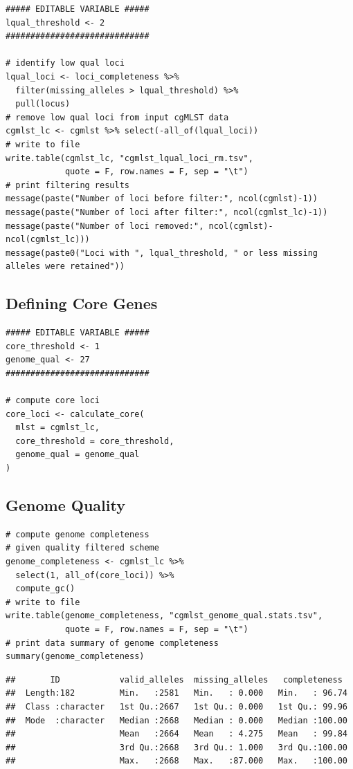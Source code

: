 \documentclass[
]{book}
\begin{document}
\begin{verbatim}
##### EDITABLE VARIABLE #####
lqual_threshold <- 2
#############################

# identify low qual loci
lqual_loci <- loci_completeness %>% 
  filter(missing_alleles > lqual_threshold) %>% 
  pull(locus)
# remove low qual loci from input cgMLST data
cgmlst_lc <- cgmlst %>% select(-all_of(lqual_loci))
# write to file
write.table(cgmlst_lc, "cgmlst_lqual_loci_rm.tsv",
            quote = F, row.names = F, sep = "\t")
# print filtering results
message(paste("Number of loci before filter:", ncol(cgmlst)-1))
message(paste("Number of loci after filter:", ncol(cgmlst_lc)-1))
message(paste("Number of loci removed:", ncol(cgmlst)-ncol(cgmlst_lc)))
message(paste0("Loci with ", lqual_threshold, " or less missing alleles were retained"))
\end{verbatim}

\subsection{Defining Core Genes}\label{defining-core-genes}

\begin{verbatim}
##### EDITABLE VARIABLE #####
core_threshold <- 1
genome_qual <- 27
#############################

# compute core loci
core_loci <- calculate_core(
  mlst = cgmlst_lc,
  core_threshold = core_threshold,
  genome_qual = genome_qual
)
\end{verbatim}

\subsection{Genome Quality}\label{genome-quality}

\begin{verbatim}
# compute genome completeness
# given quality filtered scheme
genome_completeness <- cgmlst_lc %>% 
  select(1, all_of(core_loci)) %>% 
  compute_gc()
# write to file
write.table(genome_completeness, "cgmlst_genome_qual.stats.tsv",
            quote = F, row.names = F, sep = "\t")
# print data summary of genome completeness
summary(genome_completeness)
\end{verbatim}

\begin{verbatim}
##       ID            valid_alleles  missing_alleles   completeness   
##  Length:182         Min.   :2581   Min.   : 0.000   Min.   : 96.74  
##  Class :character   1st Qu.:2667   1st Qu.: 0.000   1st Qu.: 99.96  
##  Mode  :character   Median :2668   Median : 0.000   Median :100.00  
##                     Mean   :2664   Mean   : 4.275   Mean   : 99.84  
##                     3rd Qu.:2668   3rd Qu.: 1.000   3rd Qu.:100.00  
##                     Max.   :2668   Max.   :87.000   Max.   :100.00
\end{verbatim}
\end{document}
